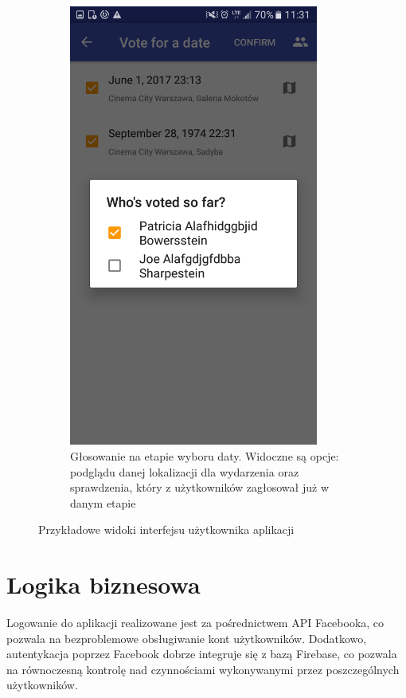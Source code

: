 \documentclass[10pt,a4paper]{article}
\begin{document}
\begin{figure}
\begin{subfigure}[t]{0.4\textwidth}
		\includegraphics[width=0.9\textwidth]{screen4.png}
		\caption{Głosowanie na etapie wyboru daty. Widoczne są opcje: podglądu danej lokalizacji
		dla wydarzenia oraz sprawdzenia, który z użytkowników zagłosował już w danym etapie}
	\end{subfigure}
	\caption{Przykładowe widoki interfejsu użytkownika aplikacji}
\end{figure}

\section{Logika biznesowa}

Logowanie do aplikacji realizowane jest za pośrednictwem API Facebooka, co pozwala na bezproblemowe
obsługiwanie kont użytkowników. Dodatkowo, autentykacja poprzez Facebook dobrze integruje się z bazą
Firebase, co pozwala na równoczesną kontrolę nad czynnościami wykonywanymi przez poszczególnych
użytkowników.
\end{document}
